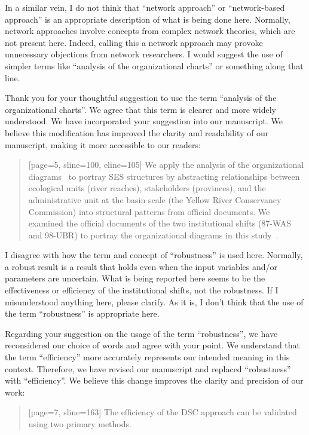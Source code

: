 \RC{} In a similar vein, I do not think that ``network approach'' or ``network-based approach'' is an appropriate description of what is being done here. Normally, network approaches involve concepts from complex network theories, which are not present here. Indeed, calling this a network approach may provoke unnecessary objections from network researchers. I would suggest the use of simpler terms like ``analysis of the organizational charts'' or something along that line.

\AR{} Thank you for your thoughtful suggestion to use the term ``analysis of the organizational charts''. We agree that this term is clearer and more widely understood. We have incorporated your suggestion into our manuscript. We believe this modification has improved the clarity and readability of our manuscript, making it more accessible to our readers:

\begin{quote}[page=5, sline=100, eline=105]
    We apply the analysis of the organizational diagrams~\cite{bodin2017b} to portray SES structures by abstracting relationships between ecological units (river reaches), stakeholders (provinces), and the administrative unit at the basin scale (the Yellow River Conservancy Commission) into structural patterns from official documents.
    We examined the official documents of the two institutional shifts (87-WAS and 98-UBR) to portray the organizational diagrams in this study~\cite{bodin2017a,kluger2020,guerrero2015}.
\end{quote}

\RC{} I disagree with how the term and concept of ``robustness'' is used here. Normally, a robust result is a result that holds even when the input variables and/or parameters are uncertain. What is being reported here seems to be the effectiveness or efficiency of the institutional shifts, not the robustness. If I misunderstood anything here, please clarify. As it is, I don't think that the use of the term ``robustness'' is appropriate here.

\AR{} Regarding your suggestion on the usage of the term ``robustness'', we have reconsidered our choice of words and agree with your point. We understand that the term ``efficiency'' more accurately represents our intended meaning in this context. Therefore, we have revised our manuscript and replaced ``robustness'' with ``efficiency''. We believe this change improves the clarity and precision of our work:

\begin{quote}[page=7, sline=163]
    The efficiency of the DSC approach can be validated using two primary methods.
\end{quote}

